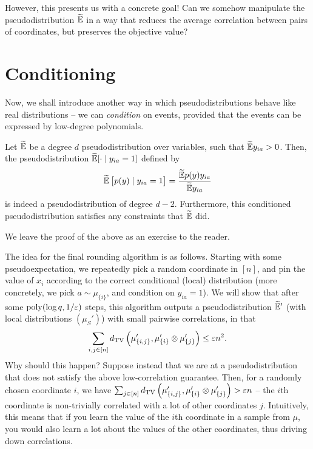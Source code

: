 \documentclass{article}
\begin{document}
However, this presents us with a concrete goal! Can we somehow manipulate the pseudodistribution $\widetilde{\mathbb{E}}$ in a way that reduces the average correlation between pairs of coordinates, but preserves the objective value?

\section{Conditioning}

Now, we shall introduce another way in which pseudodistributions behave like real distributions -- we can \emph{condition} on events, provided that the events can be expressed by low-degree polynomials.

\begin{lemma}
	Let $\widetilde{\mathbb{E}}$ be a degree $d$ pseudodistribution over variables, such that $\widetilde{\mathbb{E}} y_{ia} > 0$. Then, the pseudodistribution $\widetilde{\mathbb{E}}[ \cdot \mid y_{ia} = 1 ]$ defined by
	\[ \widetilde{\mathbb{E}} \left[ p(y) \mid y_{ia} = 1 \right] = \frac{\widetilde{\mathbb{E}} p(y) y_{ia}}{\widetilde{\mathbb{E}} y_{ia}} \]
	is indeed a pseudodistribution of degree $d-2$. Furthermore, this conditioned pseudodistribution satisfies any constraints that $\widetilde{\mathbb{E}}$ did.
\end{lemma}

We leave the proof of the above as an exercise to the reader.

The idea for the final rounding algorithm is as follows. Starting with some pseudoexpectation, we repeatedly pick a random coordinate in $[n]$, and pin the value of $x_i$ according to the correct conditional (local) distribution (more concretely, we pick $a \sim \mu_{\{i\}}$, and condition on $y_{ia} = 1$). We will show that after some $\operatorname{poly}(\log q,1/\varepsilon)$ steps, this algorithm outputs a pseudodistribution $\widetilde{\mathbb{E}}'$ (with local distributions $(\mu_S')$) with small pairwise correlations, in that
\begin{equation}
	\label{eq:low-global-corr}
	\sum_{i,j \in [n]} d_{\mathrm{TV}}\left( \mu'_{\{i,j\}} , \mu'_{\{i\}} \otimes \mu'_{\{j\}} \right) \le \varepsilon n^2.
\end{equation}
Why should this happen? Suppose instead that we are at a pseudodistribution that does not satisfy the above low-correlation guarantee. Then, for a randomly chosen coordinate $i$, we have $ \sum_{j \in [n]} d_{\mathrm{TV}}\left( \mu'_{\{i,j\}} , \mu'_{\{i\}} \otimes \mu'_{\{j\}} \right) > \varepsilon n$ -- the $i$th coordinate is non-trivially correlated with a lot of other coordinates $j$. Intuitively, this means that if you learn the value of the $i$th coordinate in a sample from $\mu$, you would also learn a lot about the values of the other coordinates, thus driving down correlations.
\end{document}
